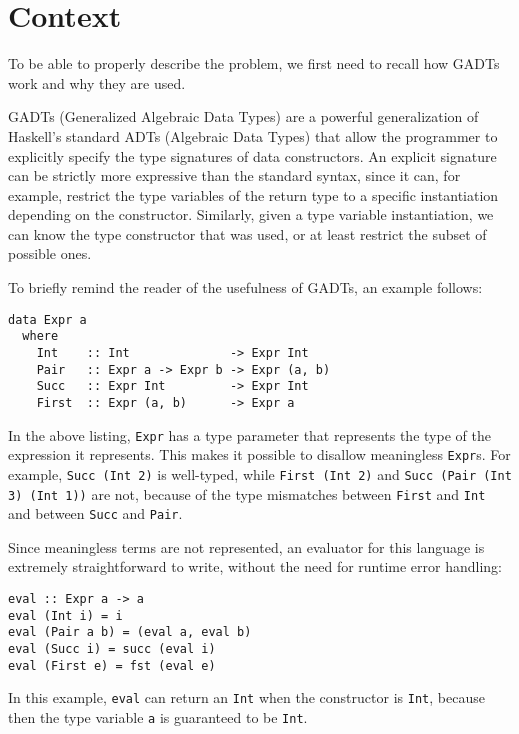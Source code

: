 \section{Context}
\label{sec:context}

To be able to properly describe the problem, we first need to recall how GADTs work and why they are used.

GADTs (Generalized Algebraic Data Types) are a powerful generalization of Haskell's standard ADTs (Algebraic Data Types) that allow the programmer to explicitly specify the type signatures of data constructors\cite{simple-unification-based-type-inference-for-gadts}.
An explicit signature can be strictly more expressive than the standard syntax, since it can, for example, restrict the type variables of the return type to a specific instantiation depending on the constructor.
Similarly, given a type variable instantiation, we can know the type constructor that was used, or at least restrict the subset of possible ones.

To briefly remind the reader of the usefulness of GADTs, an example follows:

\begin{lstlisting}[caption=A GADT describing a simple language with ints and pairs]
data Expr a
  where
    Int    :: Int              -> Expr Int
    Pair   :: Expr a -> Expr b -> Expr (a, b)
    Succ   :: Expr Int         -> Expr Int
    First  :: Expr (a, b)      -> Expr a
\end{lstlisting}

In the above listing, \texttt{Expr} has a type parameter that represents the type of the expression it represents.
This makes it possible to disallow meaningless \texttt{Expr}s.
For example, \texttt{Succ (Int 2)} is well-typed, while \texttt{First (Int 2)} and \texttt{Succ (Pair (Int 3) (Int 1))} are not, because of the type mismatches between \texttt{First} and \texttt{Int} and between \texttt{Succ} and \texttt{Pair}.

Since meaningless terms are not represented, an evaluator for this language is extremely straightforward to write, without the need for runtime error handling:

\begin{lstlisting}[caption=Evaluator for \texttt{Expr}]
eval :: Expr a -> a
eval (Int i) = i
eval (Pair a b) = (eval a, eval b)
eval (Succ i) = succ (eval i)
eval (First e) = fst (eval e)
\end{lstlisting}

In this example, \texttt{eval} can return an \texttt{Int} when the constructor is \texttt{Int}, because then the type variable \texttt{a} is guaranteed to be \texttt{Int}.

